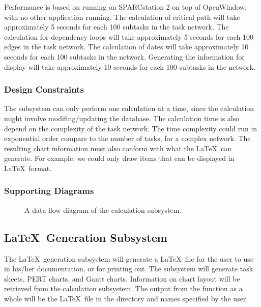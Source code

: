 Performance is based on running \xplan\/ on SPARCstation 2 on top of
OpenWindow, with no other application running.  The calculation of
critical path will take approximately 5 seconds for each 100 subtasks
in the task network.  The calculation for dependency loops will take
approximately 5 seconds for each 100 edges in the task network.  The
calculation of dates will take approximately 10 seconds for each 100
subtasks in the network. Generating the information for display will
take approximately 10 seconds for each 100 subtasks in the network.

\subsubsection{Design Constraints}

The subsystem can only perform one calculation at a time, since the
calculation might involve modifing/updating the database. The
calculation time is also depend on the complexity of the task network.
The time complexity could run in exponential order compare to the
number of tasks, for a complex network.  The resulting chart
information must also conform with what the \LaTeX\ can generate. For
example, we could only draw items that can be displayed in \LaTeX\
format.

\subsubsection{Supporting Diagrams}

\begin{figure}
\centering
\centerline{}
\caption[Data Flow Diagram of Calculation Subsystem]{\label{calc-dfd} 
A data flow diagram of the calculation subsystem.}
\end{figure}

\subsection{\LaTeX\ Generation Subsystem}

The \LaTeX\ generation subsystem will generate a \LaTeX\ file for the
user to use in his/her documentation, or for printing out. The
subsystem will generate task sheets, PERT charts, and Gantt charts.
Information on chart layout will be retrieved from the calculation
subsystem.  The output from the function as a whole will be the
\LaTeX\ file in the directory and names specified by the user.

